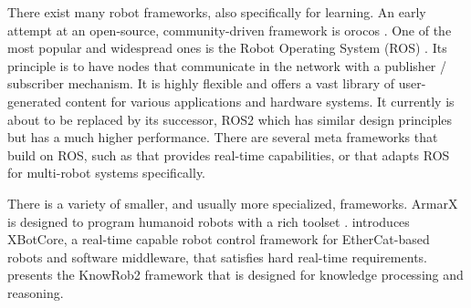 There exist many robot frameworks, also specifically for learning.
An early attempt at an open-source, community-driven framework is orocos \cite{bruyninckx2001open}.
One of the most popular and widespread ones is the Robot Operating System (ROS) \cite{quigley2009ros}.
Its principle is to have nodes that communicate in the network with a publisher / subscriber mechanism.
It is highly flexible and offers a vast library of user-generated content for various applications and hardware systems.
It currently is about to be replaced by its successor, ROS2 \cite{maruyama2016exploring} which has similar design principles but has a much higher performance.
There are several meta frameworks that build on ROS, such as \cite{chitta2017ros_control} that provides real-time capabilities, or \cite{li2016alliance} that adapts ROS for multi-robot systems specifically.

There is a variety of smaller, and usually more specialized, frameworks.
ArmarX is designed to program humanoid robots with a rich toolset \cite{vahrenkamp2015robot}.
\cite{muratore2017xbotcore} introduces XBotCore, a real-time capable robot control framework for EtherCat-based robots and software middleware, that satisfies hard real-time requirements.
\cite{beetz2018know} presents the KnowRob2 framework that is designed for knowledge processing and reasoning.
